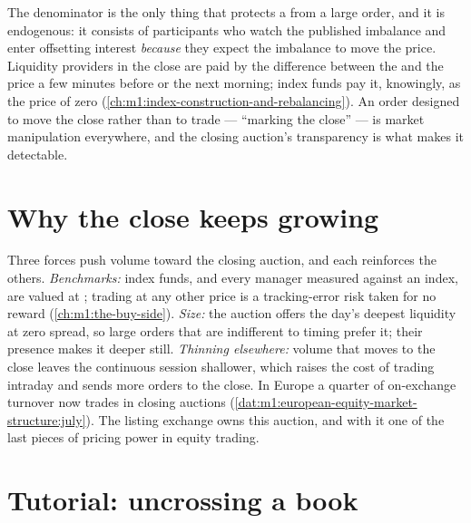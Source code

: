 The denominator is the only thing that protects a  from a large
order, and it is endogenous: it consists of participants who watch the
published imbalance and enter offsetting interest \emph{because} they expect
the imbalance to move the price. Liquidity providers in the close are paid by
the difference between the  and the price a few minutes before
or the next morning; index funds pay it, knowingly, as the price of zero
 (\cref{ch:m1:index-construction-and-rebalancing}). An order
designed to move the close rather than to trade --- ``marking the close'' ---
is market manipulation everywhere, and the closing auction's transparency is
what makes it detectable.

\section{Why the close keeps growing}

Three forces push volume toward the closing auction, and each reinforces the
others. \emph{Benchmarks:} index funds, and every manager measured against an
index, are valued at ; trading at any other price is a
tracking-error risk taken for no reward (\cref{ch:m1:the-buy-side}).
\emph{Size:} the auction offers the day's deepest liquidity at zero spread,
so large orders that are indifferent to timing prefer it; their presence
makes it deeper still. \emph{Thinning elsewhere:} volume that moves to the
close leaves the continuous session shallower, which raises the cost of
trading intraday and sends more orders to the close. In Europe a quarter of
on-exchange turnover now trades in closing auctions
(\cref{dat:m1:european-equity-market-structure:july}). The listing exchange
owns this auction, and with it one of the last pieces of pricing power in
equity trading.

\section{Tutorial: uncrossing a book}\label{tut:m1:auctions:uncross}

